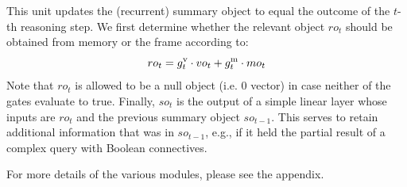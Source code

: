 This unit updates the (recurrent) summary object to equal the outcome of the $t$-th reasoning step.
We first determine whether the relevant object $ro_t$ should be obtained from memory or the frame according to:
\[ ro_t = g^{\mathrm{v}}_t \cdot vo_t + g^{\mathrm{m}}_t \cdot mo_t \]
Note that $ro_t$ is allowed to be a null object (i.e. 0 vector) in case neither of the gates evaluate to true.
Finally, $so_t$ is the output of a simple linear layer whose inputs are $ro_t$ and the previous summary object $so_{t-1}$.
This serves to retain additional information that was in $so_{t-1}$, e.g., if it held the partial result of a complex query with Boolean connectives.

For more details of the various modules, please see the appendix.
